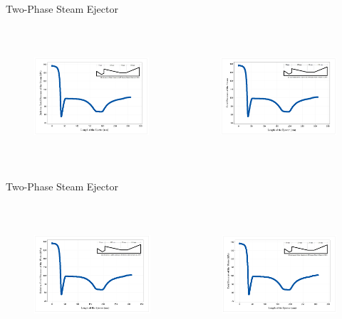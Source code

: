 \begin{frame}{Two-Phase Steam Ejector}
    \begin{columns}
    \begin{figure}
        \centering
        \includegraphics[height=4.5cm]{images/tpseRTPsteam.png}
    \end{figure}
  \begin{figure}
        \centering
        \includegraphics[height=4.5cm]{images/tpsetpsteam.png}
    \end{figure}
 \end{columns}
\end{frame}

\begin{frame}{Two-Phase Steam Ejector}
    \begin{columns}
    \begin{figure}
        \centering
        \includegraphics[height=4.5cm]{images/tpsertpwater.png}
    \end{figure}
  \begin{figure}
        \centering
        \includegraphics[height=4.5cm]{images/tpsetpwater.png}
    \end{figure}
 \end{columns}
\end{frame}

